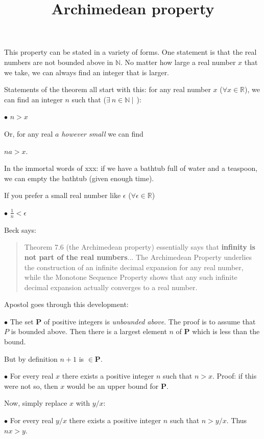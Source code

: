 \documentclass[11pt, oneside]{article}
\title{Archimedean property}
\date{}
\begin{document}
\maketitle
\Large

This property can be stated in a variety of forms.  One statement is that the real numbers are not bounded above in $\mathbb{N}$.  No matter how large a real number $x$ that we take, we can always find an integer that is larger.

Statements of the theorem all start with this:  for any real number $x$ ($\forall x \in \mathbb{R}$), we can find an integer $n$ such that ($\exists \ n \in \mathbb{N} \ | \ \ $):

$\bullet$  $n > x$

Or, for any real $a$ \emph{however small} we can find

$na > x$.

In the immortal words of xxx:  if we have a bathtub full of water and a teaspoon, we can empty the bathtub (given enough time).

If you prefer a small real number like $\epsilon$ ($\forall \epsilon \in \mathbb{R}$)

$\bullet$  $\frac{1}{n} < \epsilon$

Beck says:

\begin{quote}Theorem 7.6 (the Archimedean property) essentially says that \textbf{infinity is not part of the real numbers}... The Archimedean Property underlies the construction of an infinite decimal expansion for any real number, while the Monotone Sequence Property shows that any such infinite decimal expansion actually converges to a real number.\end{quote}

Apostol goes through this development:

$\bullet$  The set $\mathbf{P}$ of positive integers is \emph{unbounded above}.  The proof is to assume that $P$ is bounded above.  Then there is a largest element $n$ of $\mathbf{P}$ which is less than the bound.  

But by definition $n + 1$ is $\in \mathbf{P}$.

$\bullet$  For every real $x$ there exists a positive integer $n$ such that $n > x$.  Proof:  if this were not so, then $x$ would be an upper bound for $\mathbf{P}$.

Now, simply replace $x$ with $y/x$:

$\bullet$  For every real $y/x$ there exists a positive integer $n$ such that $n > y/x$.  Thus $nx > y$.
\end{document}
